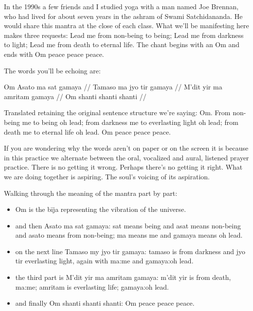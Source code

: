 \documentclass[12pt]{article}
\begin{document}
In the 1990s a few friends and I studied yoga with a man named Joe Brennan, who had lived for about seven years in the ashram of Swami Satchidananda. He would share this mantra at the close of each class. What we'll be manifesting here makes three requests: Lead me from non-being to being; Lead me from darkness to light; Lead me from death to eternal life. The chant begins with an Om and ends with Om peace peace peace.

The words you'll be echoing are:

Om Asato ma sat gamaya //
Tamaso ma jyo tir gamaya //
M'dit yir ma amritam gamaya //
Om shanti shanti shanti //

Translated retaining the original sentence structure we're saying: Om. From non-being me to being oh lead; from darkness me to everlasting light oh lead; from death me to eternal life oh lead. Om peace peace peace.

If you are wondering why the words aren't on paper or on the screen it is because in this practice we alternate between the oral, vocalized and aural, listened prayer practice. There is no getting it wrong. Perhaps there's no getting it right. What we are doing together is aspiring. The soul's voicing of its aspiration.

Walking through the meaning of the mantra part by part:

\begin{itemize}
  \item Om is the bīja representing the vibration of the universe.
  \item and then Asato ma sat gamaya: sat means being and asat means non-being and asato means from non-being; ma means me and gamaya means oh lead.
  \item on the next line Tamaso my jyo tir gamaya: tamaso is from darkness and jyo tir everlasting light, again with ma:me and gamaya:oh lead.
  \item the third part is M'dit yir ma amritam gamaya: m'dit yir is from death, ma:me; amritam is everlasting life; gamaya:oh lead.
  \item and finally Om shanti shanti shanti: Om peace peace peace.
\end{itemize}
\end{document}
